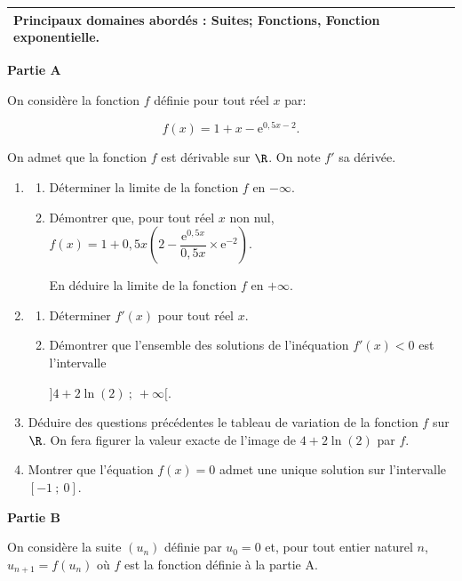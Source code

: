 \medskip

\begin{tabularx}{\linewidth}{|X|}\hline
\textbf{Principaux domaines abordés :} Suites;
Fonctions, Fonction exponentielle.\\ \hline
\end{tabularx}

\bigskip

\textbf{Partie A}

\medskip

On considère la fonction $f$ définie pour tout réel $x$ par:

\[f(x) = 1+x - \text{e}^{0,5x - 2}.\]

On admet que la fonction $f$ est dérivable sur $\R$. On note $f'$ sa dérivée.

\medskip

\begin{enumerate}
\item 
	\begin{enumerate}
		\item Déterminer la limite de la fonction $f$ en $- \infty$.
		\item Démontrer que, pour tout réel $x$ non nul, $f(x) = 1+ 0,5x\left(2 - \dfrac{\text{e}^{0,5x}}{0,5x} \times \text{e}^{-2}\right)$.
		
En déduire la limite de la fonction $f$ en $+\infty$.
	\end{enumerate}
\item 
	\begin{enumerate}
		\item Déterminer $f'(x)$ pour tout réel $x$.
		\item Démontrer que l'ensemble des solutions de l'inéquation $f'(x) < 0$ est l'intervalle

$]4 + 2\ln (2)~;~+\infty[$.
	\end{enumerate}	
\item Déduire des questions précédentes le tableau de variation de la fonction $f$ sur $\R$. On fera figurer la valeur exacte de l'image de $4 + 2\ln (2)$ par $f$.
\item Montrer que l'équation $f(x) = 0$ admet une unique solution sur l'intervalle $[-1~;~0]$.
\end{enumerate}

\bigskip

\textbf{Partie B}

\medskip

On considère la suite $\left(u_n\right)$ définie par $u_0 = 0$ et, pour tout entier naturel $n$,
\: $u_{n+1} = f\left(u_n\right)$ où $f$ est la fonction définie à la partie A.

